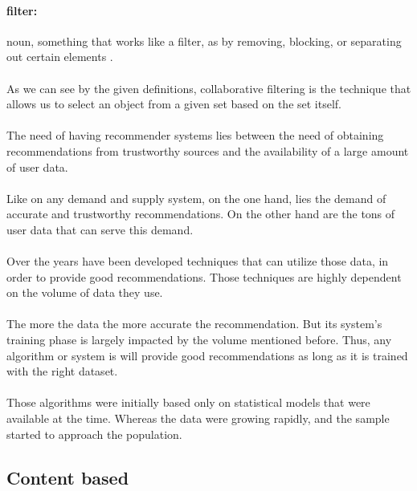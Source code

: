 \paragraph{filter:} noun, something that works like a filter, as by removing, blocking, or separating out certain elements \cite{Dictionary.com2017}.
\paragraph{} As we can see by the given definitions, collaborative filtering is the technique that allows us to select an object from a given set based on the set itself.
\paragraph{}The need of having recommender systems lies between the need of obtaining recommendations from trustworthy sources and the availability of a large amount of user data.
\paragraph{}Like on any demand and supply system, on the one hand, lies the demand of accurate and trustworthy recommendations. On the other hand are the tons of user data that can serve this demand.
\paragraph{}Over the years have been developed techniques that can utilize those data, in order to provide good recommendations. Those techniques are highly dependent on the volume of data they use. 

\paragraph{}The more the data the more accurate the recommendation. But its system's training phase is largely impacted by the volume mentioned before. Thus, any algorithm or system is will provide good recommendations as long as it is trained with the right dataset.

\paragraph{} Those algorithms were initially based only on statistical models that were available at the time. Whereas the data were growing rapidly, and the sample started to approach the population.
\subsection{Content based}
